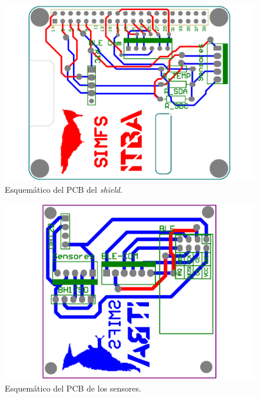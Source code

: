 \begin{figure}[H]
	\centering
	\includegraphics[width=0.75\linewidth, page=1]{ImagenesApendice/PCBShield}
	\caption{Esquemático del PCB del \textit{shield}.}
	\label{fig:anexo_shield_pcb}
\end{figure}

\begin{figure}[H]
	\centering
	\includegraphics[width=0.75\linewidth, page=1]{ImagenesApendice/PCBSensores}
	\caption{Esquemático del PCB de los sensores.}
	\label{fig:anexo_sensores_pcb}
\end{figure}